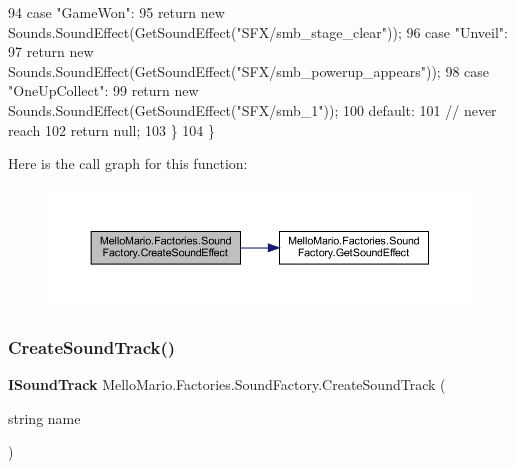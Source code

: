 \begin{DoxyCode}
94                 \textcolor{keywordflow}{case} \textcolor{stringliteral}{"GameWon"}:
95                     \textcolor{keywordflow}{return} \textcolor{keyword}{new} Sounds.SoundEffect(GetSoundEffect(\textcolor{stringliteral}{"SFX/smb\_stage\_clear"}));
96                 \textcolor{keywordflow}{case} \textcolor{stringliteral}{"Unveil"}:
97                     \textcolor{keywordflow}{return} \textcolor{keyword}{new} Sounds.SoundEffect(GetSoundEffect(\textcolor{stringliteral}{"SFX/smb\_powerup\_appears"}));
98                 \textcolor{keywordflow}{case} \textcolor{stringliteral}{"OneUpCollect"}:
99                     \textcolor{keywordflow}{return} \textcolor{keyword}{new} Sounds.SoundEffect(GetSoundEffect(\textcolor{stringliteral}{"SFX/smb\_1"}));
100                 \textcolor{keywordflow}{default}:
101                     \textcolor{comment}{// never reach}
102                     \textcolor{keywordflow}{return} null;
103             \}
104         \}
\end{DoxyCode}
Here is the call graph for this function\+:
\nopagebreak
\begin{figure}[H]
\begin{center}
\leavevmode
\includegraphics[width=350pt]{classMelloMario_1_1Factories_1_1SoundFactory_a4dd2e3b58eeabb4fb2db1de68538b991_cgraph}
\end{center}
\end{figure}
\mbox{\label{classMelloMario_1_1Factories_1_1SoundFactory_a9685c5210ea5d63e627954b453301514}} 
\subsubsection{Create\+Sound\+Track()}
{\footnotesize\ttfamily \textbf{ I\+Sound\+Track} Mello\+Mario.\+Factories.\+Sound\+Factory.\+Create\+Sound\+Track (\begin{DoxyParamCaption}\item[{string}]{name }\end{DoxyParamCaption})}



